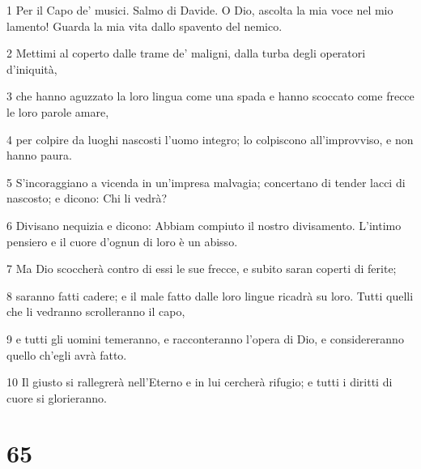 \par 1 Per il Capo de' musici. Salmo di Davide. O Dio, ascolta la mia voce nel mio lamento! Guarda la mia vita dallo spavento del nemico.
\par 2 Mettimi al coperto dalle trame de' maligni, dalla turba degli operatori d'iniquità,
\par 3 che hanno aguzzato la loro lingua come una spada e hanno scoccato come frecce le loro parole amare,
\par 4 per colpire da luoghi nascosti l'uomo integro; lo colpiscono all'improvviso, e non hanno paura.
\par 5 S'incoraggiano a vicenda in un'impresa malvagia; concertano di tender lacci di nascosto; e dicono: Chi li vedrà?
\par 6 Divisano nequizia e dicono: Abbiam compiuto il nostro divisamento. L'intimo pensiero e il cuore d'ognun di loro è un abisso.
\par 7 Ma Dio scoccherà contro di essi le sue frecce, e subito saran coperti di ferite;
\par 8 saranno fatti cadere; e il male fatto dalle loro lingue ricadrà su loro. Tutti quelli che li vedranno scrolleranno il capo,
\par 9 e tutti gli uomini temeranno, e racconteranno l'opera di Dio, e considereranno quello ch'egli avrà fatto.
\par 10 Il giusto si rallegrerà nell'Eterno e in lui cercherà rifugio; e tutti i diritti di cuore si glorieranno.

\chapter{65}

